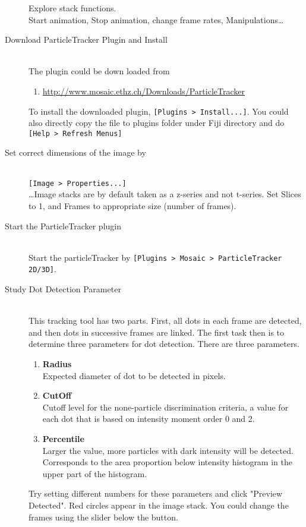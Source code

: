\documentclass[11pnt]{article}
\begin{document}
\begin{description}
Explore stack functions. \\
Start animation, Stop animation, change frame rates, Manipulations\dots

\item[Download ParticleTracker Plugin and Install]\hfill\\

The plugin could be down loaded from
\begin{enumerate}
\item \url{http://www.mosaic.ethz.ch/Downloads/ParticleTracker}
\end{enumerate}
To install the downloaded plugin, \verb"[Plugins > Install...]". You could also directly copy the file to plugins folder under Fiji directory and do \verb"[Help > Refresh Menus]" 
\item[Set correct dimensions of the image by]\hfill\\
\verb"[Image > Properties...]"\\

\dots Image stacks are by default taken as a z-series and not t-series. Set Slices to 1, and Frames to appropriate size (number of frames).

\item[Start the ParticleTracker plugin]\hfill\\

Start the particleTracker by \verb"[Plugins > Mosaic > ParticleTracker 2D/3D]". 

\item[Study Dot Detection Parameter]\hfill\\

This tracking tool has two parts. First, all dots in each frame are detected, and then dots in successive frames are linked. The first task then is to determine three parameters for dot detection. There are three parameters. 
\begin{enumerate}
\item \textbf{Radius}\hfill\\
Expected diameter of dot to be detected in pixels. 
\item \textbf{CutOff}\hfill\\
Cutoff level for the none-particle discrimination criteria, a value for each dot that is based on intensity moment order 0 and 2. 
\item \textbf{Percentile}\hfill\\
Larger the value, more particles with dark intensity will be detected. Corresponds to the area proportion below intensity histogram in the upper part of the histogram. 
\end{enumerate}
Try setting different numbers for these parameters and click "Preview Detected". Red circles appear in the image stack. You could change the frames using the slider below the button. 


\end{description}
\end{document}
